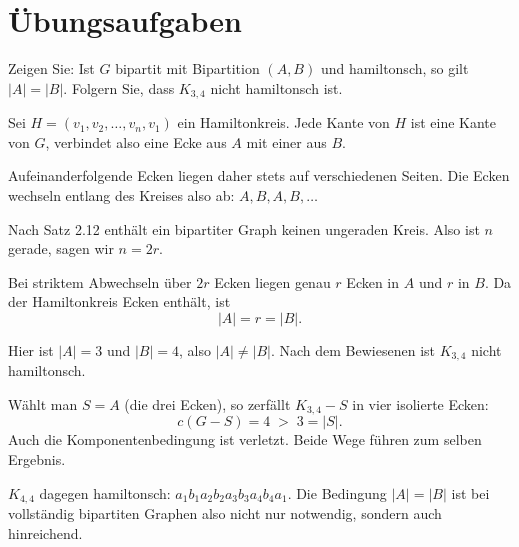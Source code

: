 \section{Übungsaufgaben}

\begin{aufgabe}
Zeigen Sie: Ist $G$ bipartit mit Bipartition $(A,B)$ und hamiltonsch, so gilt $|A| = |B|$. Folgern Sie, dass $K_{3,4}$ nicht hamiltonsch ist.

\loesung
{}
Sei $H = (v_1, v_2, \ldots, v_n, v_1)$ ein Hamiltonkreis. Jede Kante von $H$ ist eine Kante von $G$, verbindet also eine Ecke aus $A$ mit einer aus $B$.

Aufeinanderfolgende Ecken liegen daher stets auf verschiedenen Seiten. Die Ecken wechseln entlang des Kreises also ab: $A, B, A, B, \ldots$

Nach Satz 2.12 enthält ein bipartiter Graph keinen ungeraden Kreis. Also ist $n$ gerade, sagen wir $n = 2r$.

Bei striktem Abwechseln über $2r$ Ecken liegen genau $r$ Ecken in $A$ und $r$ in $B$. Da der Hamiltonkreis  Ecken enthält, ist
\[ |A| = r = |B| . \]

Hier ist $|A| = 3$ und $|B| = 4$, also $|A| \neq |B|$. Nach dem Bewiesenen ist $K_{3,4}$ nicht hamiltonsch.

Wählt man $S = A$ (die drei Ecken), so zerfällt $K_{3,4} - S$ in vier isolierte Ecken:
\[ c(G - S) = 4 \;>\; 3 = |S| . \]
Auch die Komponentenbedingung ist verletzt. Beide Wege führen zum selben Ergebnis. \checkmark

$K_{4,4}$ dagegen  hamiltonsch: $a_1 b_1 a_2 b_2 a_3 b_3 a_4 b_4 a_1$. Die Bedingung $|A| = |B|$ ist bei vollständig bipartiten Graphen also nicht nur notwendig, sondern auch hinreichend.
\end{aufgabe}

